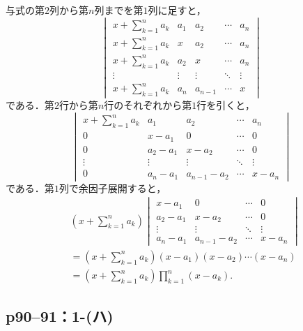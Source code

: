 \documentclass[a4paper,10pt,fleqn]{ltjsarticle}
\begin{document}
\begin{tleftbar}
  与式の第$2$列から第$n$列までを第$1$列に足すと，
  \[
    \begin{vmatrix}
      x+\sum_{k=1}^{n} a_k & a_1    & a_2     & \cdots & a_n    \\
      x+\sum_{k=1}^{n} a_k & x      & a_2     & \cdots & a_n    \\
      x+\sum_{k=1}^{n} a_k & a_2    & x       & \cdots & a_n    \\
      \vdots               & \vdots & \vdots  & \ddots & \vdots \\
      x+\sum_{k=1}^{n} a_k & a_n    & a_{n-1} & \cdots & x
    \end{vmatrix}
  \]
  である．第$2$行から第$n$行のそれぞれから第$1$行を引くと，
  \[
    \begin{vmatrix}
      x+\sum_{k=1}^{n} a_k & a_1      & a_2         & \cdots & a_n    \\
      0                    & x-a_1    & 0           & \cdots & 0      \\
      0                    & a_2 -a_1 & x-a_2       & \cdots & 0      \\
      \vdots               & \vdots   & \vdots      & \ddots & \vdots \\
      0                    & a_n-a_1  & a_{n-1}-a_2 & \cdots & x-a_n
    \end{vmatrix}
  \]
  である．第$1$列で余因子展開すると，
  \begin{align*}
     &
    (x+\sum_{k=1}^{n} a_k)
    \begin{vmatrix}
      x-a_1    & 0           & \cdots & 0      \\
      a_2 -a_1 & x-a_2       & \cdots & 0      \\
      \vdots   & \vdots      & \ddots & \vdots \\
      a_n-a_1  & a_{n-1}-a_2 & \cdots & x-a_n
    \end{vmatrix}
    \\
     & = (x+\sum_{k=1}^{n} a_k) (x-a_1)(x-a_2) \dotsm (x-a_n) \\
     & = (x+\sum_{k=1}^{n} a_k) \prod_{k=1}^{n} (x-a_k).
  \end{align*}
\end{tleftbar}
\newpage

\subsection*{p90--91：1-(ハ)}
\end{document}
